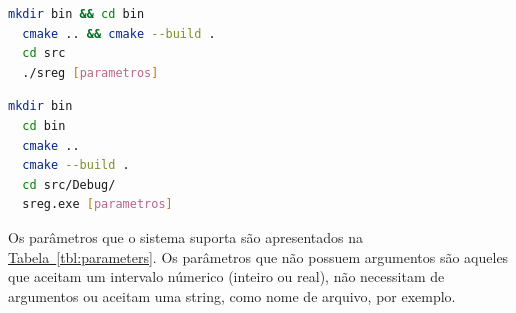 \documentclass[a4paper]{article}
\begin{document}
\begin{lstlisting}[language=bash, caption={Comandos para compilar no Linux},
    label={lst:code_1}, frame=shadowbox, frameround=fttt]
  mkdir bin && cd bin    
  cmake .. && cmake --build .  
  cd src           
  ./sreg [parametros]
\end{lstlisting}

\begin{lstlisting}[language=bash, caption={Comandos para compilar no Windows},
    label={lst:code_2}, frame=shadowbox, frameround=fttt]
  mkdir bin 
  cd bin    
  cmake ..  
  cmake --build .  
  cd src/Debug/           
  sreg.exe [parametros]
\end{lstlisting}

Os parâmetros que o sistema suporta são apresentados na
\hyperref[tbl:parameters]{Tabela~\ref*{tbl:parameters}}. Os parâmetros que não
possuem argumentos são aqueles que aceitam um intervalo númerico (inteiro ou
real), não necessitam de argumentos ou aceitam uma string, como nome de arquivo,
por exemplo.
\end{document}
